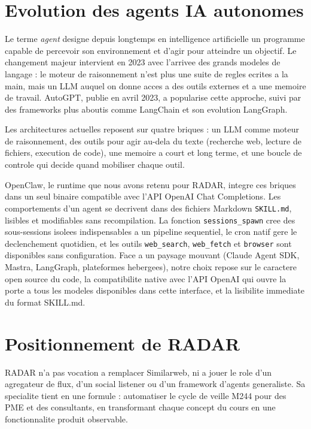 \documentclass[12pt,a4paper,openany]{report}
\begin{document}
\section{Evolution des agents IA autonomes}
\label{sec:agents-ia}

Le terme \textit{agent} designe depuis longtemps en intelligence artificielle un programme capable de percevoir son environnement et d'agir pour atteindre un objectif. Le changement majeur intervient en 2023 avec l'arrivee des grands modeles de langage : le moteur de raisonnement n'est plus une suite de regles ecrites a la main, mais un LLM auquel on donne acces a des outils externes et a une memoire de travail. AutoGPT, publie en avril 2023, a popularise cette approche, suivi par des frameworks plus aboutis comme LangChain et son evolution LangGraph.

Les architectures actuelles reposent sur quatre briques : un LLM comme moteur de raisonnement, des outils pour agir au-dela du texte (recherche web, lecture de fichiers, execution de code), une memoire a court et long terme, et une boucle de controle qui decide quand mobiliser chaque outil.

OpenClaw, le runtime que nous avons retenu pour RADAR, integre ces briques dans un seul binaire compatible avec l'API OpenAI Chat Completions. Les comportements d'un agent se decrivent dans des fichiers Markdown \texttt{SKILL.md}, lisibles et modifiables sans recompilation. La fonction \texttt{sessions\_spawn} cree des sous-sessions isolees indispensables a un pipeline sequentiel, le cron natif gere le declenchement quotidien, et les outils \texttt{web\_search}, \texttt{web\_fetch} et \texttt{browser} sont disponibles sans configuration. Face a un paysage mouvant (Claude Agent SDK, Mastra, LangGraph, plateformes hebergees), notre choix repose sur le caractere open source du code, la compatibilite native avec l'API OpenAI qui ouvre la porte a tous les modeles disponibles dans cette interface, et la lisibilite immediate du format SKILL.md.

\section{Positionnement de RADAR}
\label{sec:positionnement-radar}

RADAR n'a pas vocation a remplacer Similarweb, ni a jouer le role d'un agregateur de flux, d'un social listener ou d'un framework d'agents generaliste. Sa specialite tient en une formule : automatiser le cycle de veille M244 pour des PME et des consultants, en transformant chaque concept du cours en une fonctionnalite produit observable.
\end{document}
